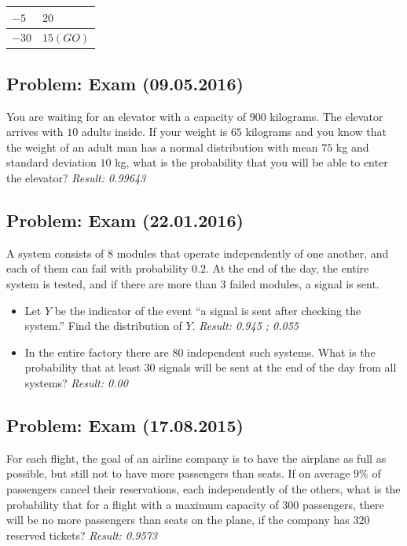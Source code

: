 \documentclass[a4paper, 12pt]{article}
\begin{document}
\begin{table}[h!]
\centering
\begin{tabular}{|l|l|}
\hline
$-5$  & $20$     \\ \hline
$-30$ & $15(GO)$ \\ \hline
\end{tabular}
\end{table}


\subsection{Problem: Exam (09.05.2016)}

You are waiting for an elevator with a capacity of $900$ kilograms. The elevator arrives with $10$ adults inside. If your weight is $65$ kilograms and you know that the weight of an adult man has a normal distribution with mean $75$ kg and standard deviation $10$ kg, what is the probability that you will be able to enter the elevator?
\textit{Result: {0.99643}}


\subsection{Problem: Exam (22.01.2016)}
A system consists of $8$ modules that operate independently of one another, and each of them can fail with probability $0.2$. At the end of the day, the entire system is tested, and if there are more than $3$ failed modules, a signal is sent.
\begin{itemize}
  \item [a)] Let $Y$ be the indicator of the event “a signal is sent after checking the system.” Find the distribution of $Y$.
\textit{Result: {0.945 ; 0.055}}
\item [b)] In the entire factory there are $80$ independent such systems. What is the probability that at least $30$ signals will be sent at the end of the day from all systems?
\textit{Result: {0.00}}

\end{itemize}



\subsection{Problem: Exam (17.08.2015)}

For each flight, the goal of an airline company is to have the airplane as full as possible, but still not to have more passengers than seats. If on average $9\%$ of passengers cancel their reservations, each independently of the others, what is the probability that for a flight with a maximum capacity of $300$ passengers, there will be no more passengers than seats on the plane, if the company has $320$ reserved tickets?
\textit{Result: {0.9573}}
\end{document}
